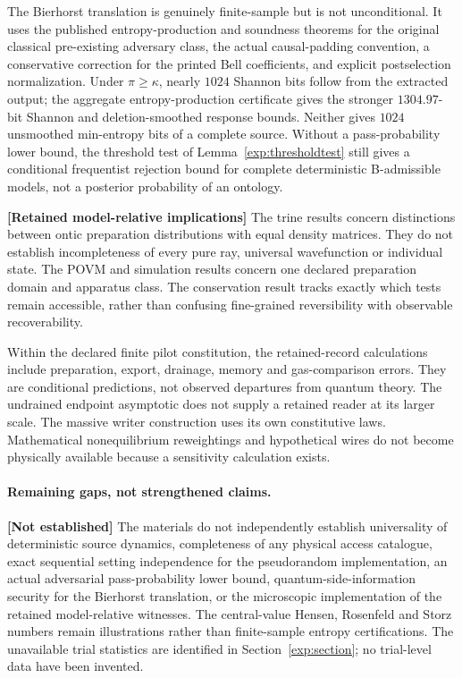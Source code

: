 \documentclass[11pt,a4paper]{article}
\theoremstyle{definition}
\theoremstyle{remark}\newtheorem{remark}[theorem]{Remark}
\newcommand{\status}[1]{\textbf{[#1]}\quad}
\begin{document}
The Bierhorst translation is genuinely finite-sample but is not unconditional. It uses the published entropy-production and soundness theorems for the original classical pre-existing adversary class, the actual causal-padding convention, a conservative correction for the printed Bell coefficients, and explicit postselection normalization. Under $\pi\ge\kappa$, nearly $1024$ Shannon bits follow from the extracted output; the aggregate entropy-production certificate gives the stronger $1304.97$-bit Shannon and deletion-smoothed response bounds. Neither gives $1024$ unsmoothed min-entropy bits of a complete source. Without a pass-probability lower bound, the threshold test of Lemma~\ref{exp:thresholdtest} still gives a conditional frequentist rejection bound for complete deterministic B-admissible models, not a posterior probability of an ontology.

\status{Retained model-relative implications}
The trine results concern distinctions between ontic preparation distributions with equal density matrices. They do not establish incompleteness of every pure ray, universal wavefunction or individual state. The POVM and simulation results concern one declared preparation domain and apparatus class. The conservation result tracks exactly which tests remain accessible, rather than confusing fine-grained reversibility with observable recoverability.

Within the declared finite pilot constitution, the retained-record calculations include preparation, export, drainage, memory and gas-comparison errors. They are conditional predictions, not observed departures from quantum theory. The undrained endpoint asymptotic does not supply a retained reader at its larger scale. The massive writer construction uses its own constitutive laws. Mathematical nonequilibrium reweightings and hypothetical wires do not become physically available because a sensitivity calculation exists.

\paragraph{Remaining gaps, not strengthened claims.}
\status{Not established}
The materials do not independently establish universality of deterministic source dynamics, completeness of any physical access catalogue, exact sequential setting independence for the pseudorandom implementation, an actual adversarial pass-probability lower bound, quantum-side-information security for the Bierhorst translation, or the microscopic implementation of the retained model-relative witnesses. The central-value Hensen, Rosenfeld and Storz numbers remain illustrations rather than finite-sample entropy certifications. The unavailable trial statistics are identified in Section~\ref{exp:section}; no trial-level data have been invented.
\end{document}
